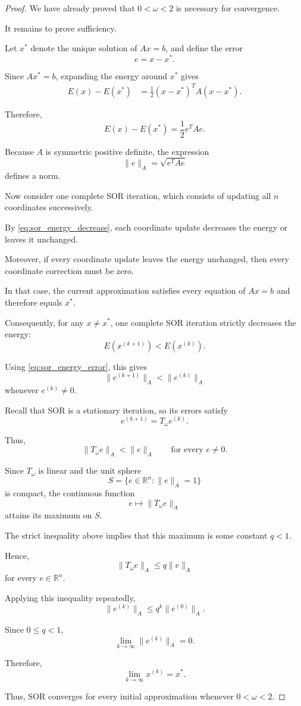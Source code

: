 \documentclass[11pt,a4paper]{article}
\theoremstyle{definition}
\theoremstyle{remark}
\begin{document}
\begin{proof}
We have already proved that $0<\omega<2$
is necessary for convergence.

It remains to prove sufficiency.

Let $x^*$ denote the unique solution of
$Ax=b$, and define the error
\[
    e=x-x^*.
\]

Since $Ax^*=b$, expanding the energy around
$x^*$ gives
\[
\begin{aligned}
E(x)-E(x^*)
&=
\frac12(x-x^*)^TA(x-x^*).
\end{aligned}
\]

Therefore,
\begin{equation}
    \boxed{
    E(x)-E(x^*)
    =
    \frac12 e^TAe.
    }
    \label{eq:sor_energy_error}
\end{equation}

Because $A$ is symmetric positive definite,
the expression
\[
    \|e\|_A=\sqrt{e^TAe}
\]
defines a norm.

Now consider one complete SOR iteration,
which consists of updating all $n$ coordinates
successively.

By \eqref{eq:sor_energy_decrease}, each
coordinate update decreases the energy or
leaves it unchanged.

Moreover, if every coordinate update leaves
the energy unchanged, then every coordinate
correction must be zero.

In that case, the current approximation
satisfies every equation of $Ax=b$ and
therefore equals $x^*$.

Consequently, for any $x\neq x^*$,
one complete SOR iteration strictly
decreases the energy:
\[
    E(x^{(k+1)})<E(x^{(k)}).
\]

Using \eqref{eq:sor_energy_error}, this gives
\[
    \|e^{(k+1)}\|_A
    <
    \|e^{(k)}\|_A
\]
whenever $e^{(k)}\neq0$.

Recall that SOR is a stationary iteration,
so its errors satisfy
\[
    e^{(k+1)}=T_\omega e^{(k)}.
\]

Thus,
\[
    \|T_\omega e\|_A<\|e\|_A
    \qquad\text{for every }e\neq0.
\]

Since $T_\omega$ is linear and the unit
sphere
\[
    S=\{e\in\mathbb{R}^n:\|e\|_A=1\}
\]
is compact, the continuous function
\[
    e\longmapsto\|T_\omega e\|_A
\]
attains its maximum on $S$.

The strict inequality above implies that
this maximum is some constant $q<1$.

Hence,
\[
    \|T_\omega e\|_A
    \leq q\|e\|_A
\]
for every $e\in\mathbb{R}^n$.

Applying this inequality repeatedly,
\[
    \|e^{(k)}\|_A
    \leq q^k\|e^{(0)}\|_A.
\]

Since $0\leq q<1$,
\[
    \lim_{k\to\infty}\|e^{(k)}\|_A=0.
\]

Therefore,
\[
    \boxed{
    \lim_{k\to\infty}x^{(k)}=x^*.
    }
\]

Thus, SOR converges for every initial
approximation whenever $0<\omega<2$.
\end{proof}
\end{document}
